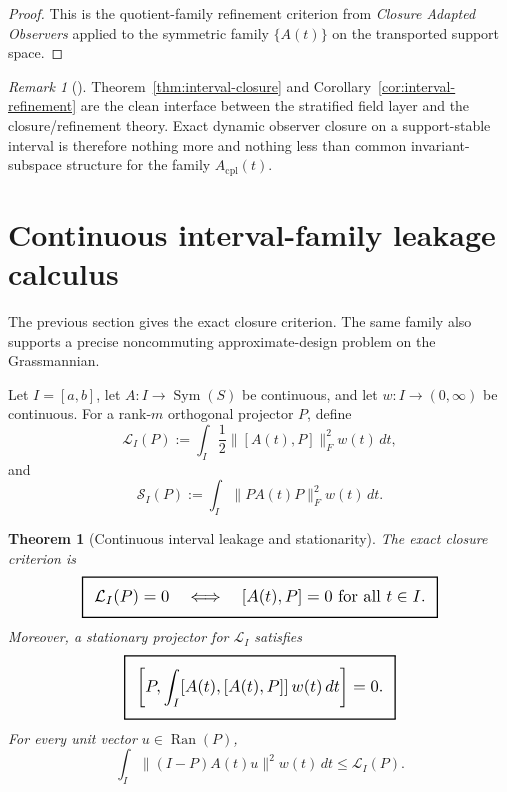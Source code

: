 \documentclass[11pt,a4paper]{article}
\numberwithin{equation}{section}
\DeclareMathOperator{\Ran}{Ran}
\DeclareMathOperator{\Sym}{Sym}
\newcommand{\geomboxed}[1]{%
  \setlength{\fboxsep}{8pt}%
  \setlength{\fboxrule}{0.9pt}%
  \fbox{\scalebox{1.18}{$\displaystyle #1$}}%
}
\theoremstyle{thmcompact}
\newtheorem{theorem}{Theorem}[section]
\theoremstyle{remark}
\newtheorem*{remarkplain}{Remark}
\newenvironment{remark}[1][]%
{\begin{remarkbox}\begin{remarkplain}[#1]\normalfont}
{\end{remarkplain}\end{remarkbox}}
\begin{document}
\begin{proof}
This is the quotient-family refinement criterion from \emph{Closure Adapted Observers} applied to the symmetric family $\{A(t)\}$ on the transported support space.
\end{proof}

\begin{remark}
Theorem~\ref{thm:interval-closure} and Corollary~\ref{cor:interval-refinement} are the clean interface between the stratified field layer and the closure/refinement theory. Exact dynamic observer closure on a support-stable interval is therefore nothing more and nothing less than common invariant-subspace structure for the family $A_{\mathrm{cpl}}(t)$.
\end{remark}

\section{Continuous interval-family leakage calculus}

The previous section gives the exact closure criterion. The same family also supports a precise noncommuting approximate-design problem on the Grassmannian.

Let $I=[a,b]$, let $A:I\to\Sym(S)$ be continuous, and let $w:I\to(0,\infty)$ be continuous. For a rank-$m$ orthogonal projector $P$, define
\begin{equation}
\mathcal L_I(P):=
\int_I \frac12\|[A(t),P]\|_F^2w(t)\,dt,
\label{eq:interval-leakage}
\end{equation}
and
\begin{equation}
\mathcal S_I(P):=
\int_I \|PA(t)P\|_F^2w(t)\,dt.
\label{eq:interval-visible}
\end{equation}

\begin{theorem}[Continuous interval leakage and stationarity]
\label{thm:interval-leakage-stationarity}
The exact closure criterion is
\begin{equation}
\geomboxed{
\mathcal L_I(P)=0
\quad\Longleftrightarrow\quad
[A(t),P]=0\ \text{for all }t\in I.
}
\label{eq:interval-L-zero}
\end{equation}
Moreover, a stationary projector for $\mathcal L_I$ satisfies
\begin{equation}
\geomboxed{
\left[
P,
\int_I [A(t),[A(t),P]]\,w(t)\,dt
\right]=0.
}
\label{eq:interval-stationarity}
\end{equation}
For every unit vector $u\in \Ran(P)$,
\begin{equation}
\int_I \|(I-P)A(t)u\|^2w(t)\,dt
\le
\mathcal L_I(P).
\label{eq:near-invariance-bound}
\end{equation}
\end{theorem}
\end{document}
